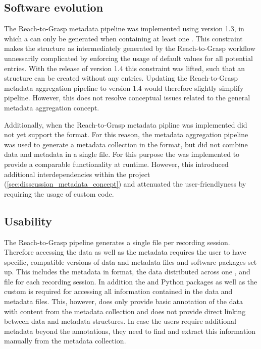 \subsection{Software evolution}
The Reach-to-Grasp metadata pipeline was implemented using  version 1.3, in which a   can only be generated when containing at least one . This constraint makes the  structure as intermediately generated by the Reach-to-Grasp workflow unnessarily complicated by enforcing the usage of default values for all potential  entries. With the release of  version 1.4 this constraint was lifted, such that an  structure can be created without any  entries. Updating the Reach-to-Grasp metadata aggregation pipeline to  version 1.4 would therefore slightly simplify pipeline. However, this does not resolve conceptual issues related to the general metadata aggregation concept.

Additionally, when the Reach-to-Grasp metadata pipline was implemented  did not yet support the  format. For this reason, the metadata aggregation pipeline was used to generate a metadata collection in the  format, but did not combine data and metadata in a single file. For this purpose the  was implemented to provide a comparable functionality at runtime. However, this introduced additional interdependencies within the project (\cref{sec:disscussion_metadata_concept}) and attenuated the user-friendlyness by requiring the usage of custom code.


\subsection{Usability}
The Reach-to-Grasp pipeline generates a single  file per recording session. Therefore accessing the data as well as the metadata requires the user to have  specific, compatible versions of data and metadata files and software packages set up. This includes the metadata in  format, the data distributed across one ,  and  file for each recording session. In addition the  and  Python packages as well as the custom  is required for accessing all information contained in the data and metadata files. This, however, does only provide basic annotation of the data with content from the metadata collection and does not provide direct linking between data and metadata structures. In case the users require additional metadata beyond the annotations, they need to find and extract this information manually from the metadata collection.

